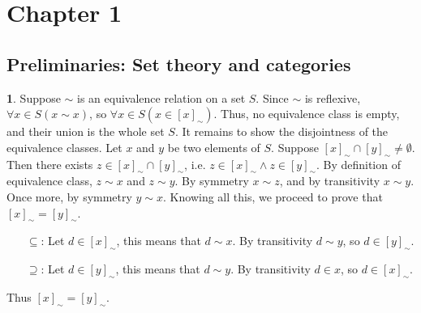 \documentclass{article}
\theoremstyle{definition}
\newcommand{\ec}[2][\sim]{{\left[#2\right]}_{#1}}
\theoremstyle{definition}
\theoremstyle{definition}
\newtheorem{solution-internal}{}[subsection]
\newenvironment{solution}{
  \medskip
  \begin{solution-internal}
}{
  \end{solution-internal}
}
\begin{document}
\section*{Chapter 1}
\subsection*{Preliminaries: Set theory and categories}
\setcounter{subsection}{1}

\begin{solution}
Suppose $\sim$ is an equivalence relation on a set $S$.
Since $\sim$ is reflexive, $\forall x \in S (x \sim x) $, so $\forall x\in S
(x \in \ec{x})$. Thus, no equivalence class is empty, and their union is
the whole set $S$.  It remains to show the disjointness of the equivalence
classes.  Let $x$ and $y$ be two elements of $S$. Suppose $\ec{x} \cap
\ec{y} \neq \emptyset$. Then there exists $z \in \ec{x} \cap
\ec{y}$, i.e. $z \in \ec{x} \wedge z \in \ec{y}$. By
definition of equivalence class, $z \sim x$ and $z \sim y$. By symmetry $x \sim
z$, and by transitivity $x \sim y$. Once more, by symmetry $y \sim x$. Knowing
all this, we proceed to prove that $\ec{x} = \ec{y}$.
\begin{itemize}
  \item[$\subseteq$:] Let $d \in \ec{x}$, this means that $d \sim x$. By
    transitivity $d \sim y$, so $d \in \ec{y}$.
  \item[$\supseteq$:] Let $d \in \ec{y}$, this means that $d \sim y$. By
  transitivity $d \in x$, so $d \in \ec{x}$.
\end{itemize}

Thus $\ec{x} = \ec{y}$.
\end{solution}
\end{document}
